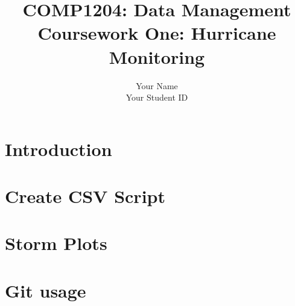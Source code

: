 \documentclass[]{article}
\title{COMP1204: Data Management \\ Coursework One: Hurricane Monitoring }
\author{Your Name \\ Your Student ID}
\begin{document}
\maketitle

\section{Introduction}

\section{Create CSV Script}

\section{Storm Plots}

\section{Git usage}
\end{document}
